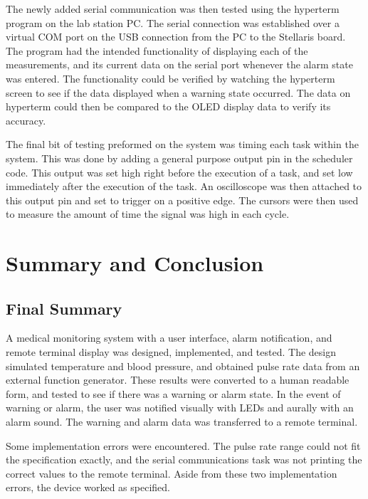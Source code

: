 \documentclass[12pt]{article} %
\begin{document}
    The newly added serial communication was then tested using the hyperterm
    program on the lab station PC. The serial connection was established over a
    virtual COM port on the USB connection from the PC to the Stellaris board.
    The program had the intended functionality of displaying each of the
    measurements, and its current data on the serial port whenever the alarm
    state was entered. The functionality could be verified by watching the
    hyperterm screen to see if the data displayed when a warning state occurred.
    The data on hyperterm could then be compared to the OLED display data to
    verify its accuracy. 
    
    The final bit of testing preformed on the system was timing each task within
    the system. This was done by adding a general purpose output pin in the
    scheduler code. This output was set high right before the execution of a task,
    and set low immediately after the execution of the task. An oscilloscope was
    then attached to this output pin and set to trigger on a positive edge. The
    cursors were then used to measure the amount of time the signal was high in
    each cycle.


    \section{Summary and Conclusion}

    \subsection{Final Summary} 

    A medical monitoring system with a user interface, alarm notification, and
    remote terminal display was designed, implemented, and tested.  The design
    simulated temperature and blood pressure, and obtained pulse rate data from
    an external function generator.  These results were converted to a human
    readable form, and tested to see if there was a warning or alarm state.
    In the event of warning or alarm, the user was notified visually with LEDs
    and aurally with an alarm sound.  The warning and alarm data was transferred
    to a remote terminal.  

    Some implementation errors were encountered.  The pulse rate range could
    not fit the specification exactly, and the serial communications task was
    not printing the correct values to the remote terminal. Aside from these
    two implementation errors, the device worked as specified.
\end{document}
